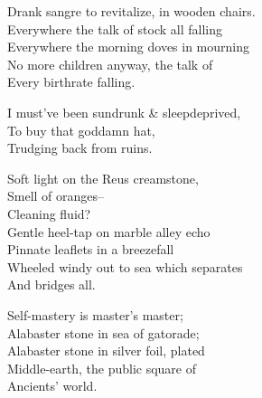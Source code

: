 Drank sangre to revitalize, in wooden chairs. \\
Everywhere the talk of stock all falling \\
Everywhere the morning doves in mourning \\
No more children anyway, the talk of \\
Every birthrate falling. 

I must've been sundrunk \& sleepdeprived, \\
To buy that goddamn hat, \\
Trudging back from ruins. 

Soft light on the Reus creamstone, \\
Smell of oranges-- \\
Cleaning fluid? \\
Gentle heel-tap on marble alley echo \\
Pinnate leaflets in a breezefall \\
Wheeled windy out to sea which separates \\
And bridges all.

Self-mastery is master's master; \\
Alabaster stone in sea of gatorade; \\
Alabaster stone in silver foil, plated \\
Middle-earth, the public square of \\
Ancients' world.